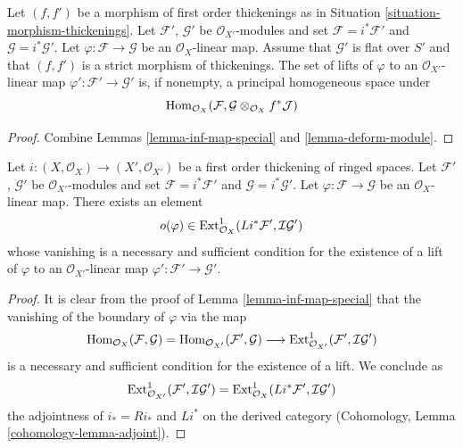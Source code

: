 \begin{lemma}
\label{lemma-inf-map-rel}
Let $(f, f')$ be a morphism of first order thickenings as in
Situation \ref{situation-morphism-thickenings}.
Let $\mathcal{F}'$, $\mathcal{G}'$ be $\mathcal{O}_{X'}$-modules and set
$\mathcal{F} = i^*\mathcal{F}'$ and $\mathcal{G} = i^*\mathcal{G}'$.
Let $\varphi : \mathcal{F} \to \mathcal{G}$ be an $\mathcal{O}_X$-linear map.
Assume that $\mathcal{G}'$ is flat over $S'$ and that
$(f, f')$ is a strict morphism of thickenings.
The set of lifts of $\varphi$ to an $\mathcal{O}_{X'}$-linear map
$\varphi' : \mathcal{F}' \to \mathcal{G}'$ is, if nonempty, a principal
homogeneous space under
$$
\mathop{\mathrm{Hom}}\nolimits_{\mathcal{O}_X}(\mathcal{F},
\mathcal{G} \otimes_{\mathcal{O}_X} f^*\mathcal{J})
$$
\end{lemma}

\begin{proof}
Combine Lemmas \ref{lemma-inf-map-special} and \ref{lemma-deform-module}.
\end{proof}

\begin{lemma}
\label{lemma-inf-obs-map-special}
Let $i : (X, \mathcal{O}_X) \to (X', \mathcal{O}_{X'})$
be a first order thickening of ringed spaces.
Let $\mathcal{F}'$, $\mathcal{G}'$ be $\mathcal{O}_{X'}$-modules and set
$\mathcal{F} = i^*\mathcal{F}'$ and $\mathcal{G} = i^*\mathcal{G}'$.
Let $\varphi : \mathcal{F} \to \mathcal{G}$ be an $\mathcal{O}_X$-linear map.
There exists an element
$$
o(\varphi) \in
\mathop{\mathrm{Ext}}\nolimits^1_{\mathcal{O}_X}(Li^*\mathcal{F}',
\mathcal{I}\mathcal{G}')
$$
whose vanishing is a necessary and sufficient condition for the
existence of a lift of $\varphi$ to an $\mathcal{O}_{X'}$-linear map
$\varphi' : \mathcal{F}' \to \mathcal{G}'$.
\end{lemma}

\begin{proof}
It is clear from the proof of Lemma \ref{lemma-inf-map-special} that the
vanishing of the boundary of $\varphi$ via the map
$$
\mathop{\mathrm{Hom}}\nolimits_{\mathcal{O}_X}(\mathcal{F}, \mathcal{G}) =
\mathop{\mathrm{Hom}}\nolimits_{\mathcal{O}_{X'}}(\mathcal{F}', \mathcal{G}) \longrightarrow
\mathop{\mathrm{Ext}}\nolimits^1_{\mathcal{O}_{X'}}(\mathcal{F}', \mathcal{I}\mathcal{G}')
$$
is a necessary and sufficient condition for the existence of a lift. We
conclude as
$$
\mathop{\mathrm{Ext}}\nolimits^1_{\mathcal{O}_{X'}}(\mathcal{F}', \mathcal{I}\mathcal{G}') =
\mathop{\mathrm{Ext}}\nolimits^1_{\mathcal{O}_X}(Li^*\mathcal{F}', \mathcal{I}\mathcal{G}')
$$
the adjointness of $i_* = Ri_*$ and $Li^*$ on the derived category
(Cohomology, Lemma \ref{cohomology-lemma-adjoint}).
\end{proof}

